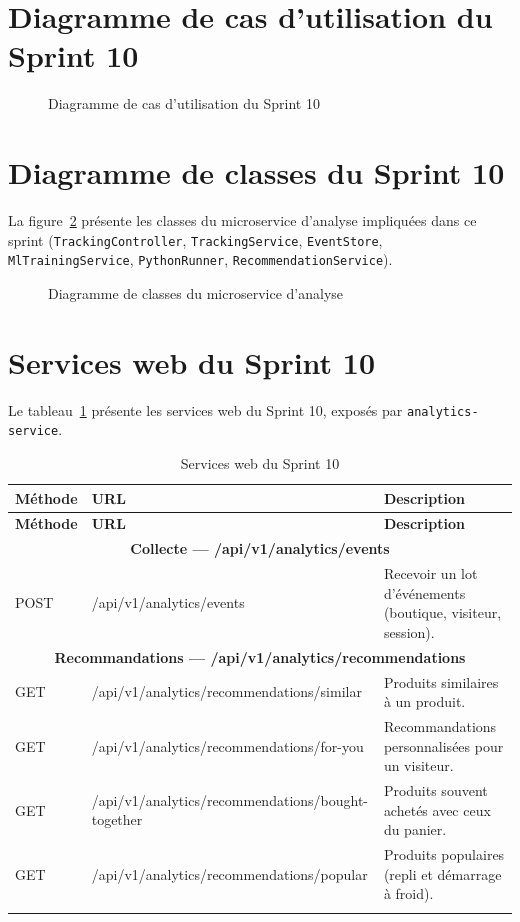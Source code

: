 \section{Diagramme de cas d'utilisation du Sprint 10}
\begin{figure}[H]
    \centering
    \caption{Diagramme de cas d'utilisation du Sprint 10}
    \label{fig:cu-sprint10}
\end{figure}

\section{Diagramme de classes du Sprint 10}
La figure~\ref{fig:classes-ml} présente les classes du microservice d'analyse impliquées dans ce sprint (\texttt{TrackingController}, \texttt{TrackingService}, \texttt{EventStore}, \texttt{MlTrainingService}, \texttt{PythonRunner}, \texttt{RecommendationService}).
\begin{figure}[H]
    \centering
    \caption{Diagramme de classes du microservice d'analyse}
    \label{fig:classes-ml}
\end{figure}

\section{Services web du Sprint 10}
Le tableau~\ref{tab:ws-sprint10} présente les services web du Sprint 10, exposés par \texttt{analytics-service}.
\renewcommand{\arraystretch}{1.15}
\setlength{\tabcolsep}{4pt}
\begin{longtable}{|p{1.5cm}|p{6.8cm}|p{6.2cm}|}
\hline
\textbf{Méthode} & \textbf{URL} & \textbf{Description} \\
\hline
\endfirsthead
\hline
\textbf{Méthode} & \textbf{URL} & \textbf{Description} \\
\hline
\endhead
\multicolumn{3}{|c|}{\textbf{Collecte --- /api/v1/analytics/events}} \\
\hline
POST & /api/v1/analytics/events & Recevoir un lot d'événements (boutique, visiteur, session). \\
\hline
\multicolumn{3}{|c|}{\textbf{Recommandations --- /api/v1/analytics/recommendations}} \\
\hline
GET & /api/v1/analytics/recommendations/similar & Produits similaires à un produit. \\
\hline
GET & /api/v1/analytics/recommendations/for-you & Recommandations personnalisées pour un visiteur. \\
\hline
GET & /api/v1/analytics/recommendations/bought-together & Produits souvent achetés avec ceux du panier. \\
\hline
GET & /api/v1/analytics/recommendations/popular & Produits populaires (repli et démarrage à froid). \\
\hline
\caption{Services web du Sprint 10}
\label{tab:ws-sprint10}
\end{longtable}

